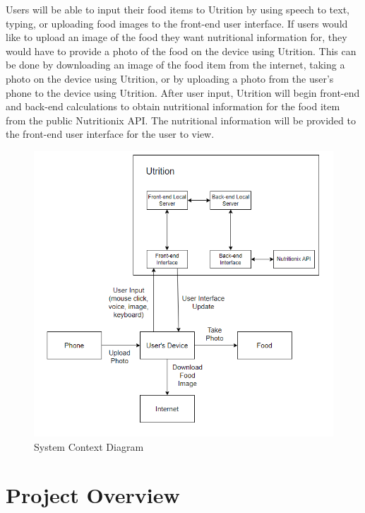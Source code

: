 \documentclass[12pt, titlepage]{article}
\begin{document}
Users will be able to input their food items to Utrition by using speech to text, typing, or uploading food images to the front-end user interface. If users would like to upload an image of the food they want nutritional information for, they would have to provide a photo of the food on the device using Utrition. This can be done by downloading an image of the food item from the internet, taking a photo on the device using Utrition, or by uploading a photo from the user's phone to the device using Utrition. After user input, Utrition will begin front-end and back-end calculations to obtain nutritional information for the food item from the public Nutritionix API. The nutritional information will be provided to the front-end user interface for the user to view.


\begin{figure}[H]
	\centering
	\includegraphics[scale=1]{System_Context_Diagram.png}
	\caption{System Context Diagram}
\end{figure}


\section{Project Overview}
\end{document}
